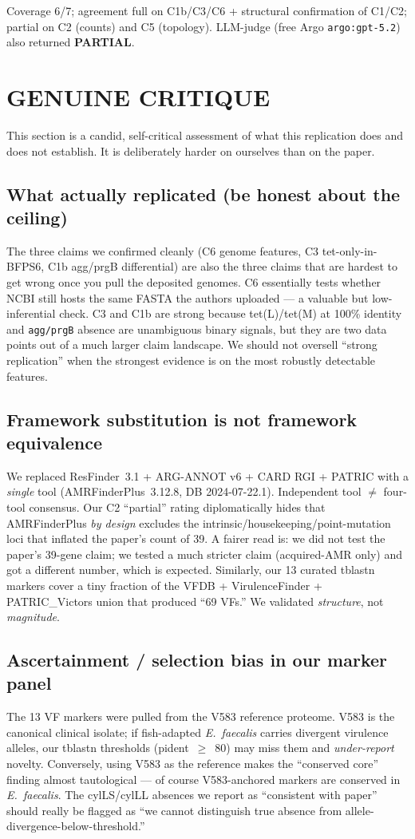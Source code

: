 \documentclass[11pt]{article}
\begin{document}
\medskip
Coverage 6/7; agreement full on C1b/C3/C6 + structural confirmation of C1/C2; partial on C2 (counts) and C5 (topology). LLM-judge (free Argo \texttt{argo:gpt-5.2}) also returned \textbf{PARTIAL}.

\section{GENUINE CRITIQUE}
This section is a candid, self-critical assessment of what this replication does and does not establish. It is deliberately harder on ourselves than on the paper.

\subsection{What actually replicated (be honest about the ceiling)}
The three claims we confirmed cleanly (C6 genome features, C3 tet-only-in-BFPS6, C1b agg/prgB differential) are also the three claims that are hardest to get wrong once you pull the deposited genomes. C6 essentially tests whether NCBI still hosts the same FASTA the authors uploaded --- a valuable but low-inferential check. C3 and C1b are strong because tet(L)/tet(M) at 100\% identity and \texttt{agg/prgB} absence are unambiguous binary signals, but they are two data points out of a much larger claim landscape. We should not oversell ``strong replication'' when the strongest evidence is on the most robustly detectable features.

\subsection{Framework substitution is not framework equivalence}
We replaced ResFinder~3.1 + ARG-ANNOT v6 + CARD RGI + PATRIC with a \emph{single} tool (AMRFinderPlus~3.12.8, DB 2024-07-22.1). Independent tool $\neq$ four-tool consensus. Our C2 ``partial'' rating diplomatically hides that AMRFinderPlus \emph{by design} excludes the intrinsic/housekeeping/point-mutation loci that inflated the paper's count of 39. A fairer read is: we did not test the paper's 39-gene claim; we tested a much stricter claim (acquired-AMR only) and got a different number, which is expected. Similarly, our 13 curated tblastn markers cover a tiny fraction of the VFDB + VirulenceFinder + PATRIC\_Victors union that produced ``69 VFs.'' We validated \emph{structure}, not \emph{magnitude}.

\subsection{Ascertainment / selection bias in our marker panel}
The 13 VF markers were pulled from the V583 reference proteome. V583 is the canonical clinical isolate; if fish-adapted \emph{E.\ faecalis} carries divergent virulence alleles, our tblastn thresholds (pident~$\geq$~80) may miss them and \emph{under-report} novelty. Conversely, using V583 as the reference makes the ``conserved core'' finding almost tautological --- of course V583-anchored markers are conserved in \emph{E.\ faecalis}. The cylLS/cylLL absences we report as ``consistent with paper'' should really be flagged as ``we cannot distinguish true absence from allele-divergence-below-threshold.''
\end{document}
